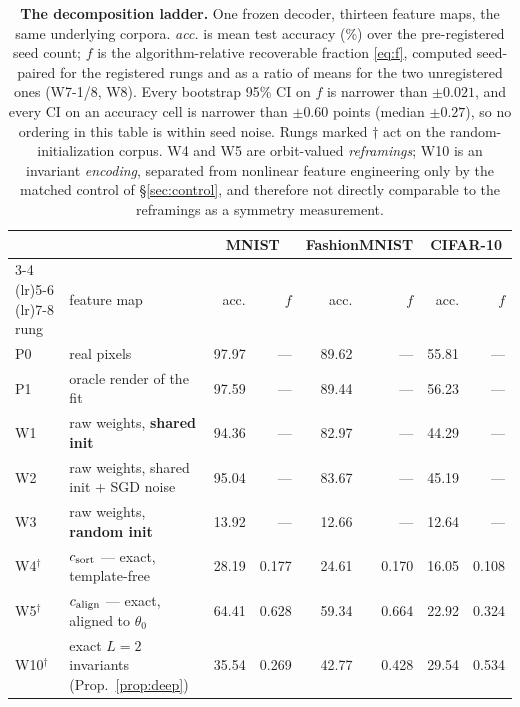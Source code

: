 \begin{table}[t]
\centering\small
\caption{\textbf{The decomposition ladder.} One frozen decoder, thirteen feature maps, the same underlying corpora. \emph{acc.} is mean test accuracy (\%) over the pre-registered seed count; $f$ is the algorithm-relative recoverable fraction \eqref{eq:f}, computed seed-paired for the registered rungs and as a ratio of means for the two unregistered ones (W7-1/8, W8). Every bootstrap 95\% CI on $f$ is narrower than $\pm0.021$, and every CI on an accuracy cell is narrower than $\pm0.60$ points (median $\pm0.27$), so no ordering in this table is within seed noise. Rungs marked $\dagger$ act on the random-initialization corpus. W4 and W5 are orbit-valued \emph{reframings}; W10 is an invariant \emph{encoding}, separated from nonlinear feature engineering only by the matched control of \S\ref{sec:control}, and therefore not directly comparable to the reframings as a symmetry measurement.}
\label{tab:ladder}
\begin{tabular}{@{}llr@{\hspace{5pt}}rr@{\hspace{5pt}}rr@{\hspace{5pt}}r@{}}
\toprule
& & \multicolumn{2}{c}{MNIST} & \multicolumn{2}{c}{FashionMNIST} & \multicolumn{2}{c}{CIFAR-10} \\
\cmidrule(lr){3-4} \cmidrule(lr){5-6} \cmidrule(lr){7-8}
rung & feature map & acc. & $f$ & acc. & $f$ & acc. & $f$ \\
\midrule
P0 & real pixels & 97.97 & --- & 89.62 & --- & 55.81 & --- \\
P1 & oracle render of the fit & 97.59 & --- & 89.44 & --- & 56.23 & --- \\
\midrule
W1 & raw weights, \textbf{shared init} & 94.36 & --- & 82.97 & --- & 44.29 & --- \\
W2 & raw weights, shared init + SGD noise & 95.04 & --- & 83.67 & --- & 45.19 & --- \\
W3 & raw weights, \textbf{random init} & 13.92 & --- & 12.66 & --- & 12.64 & --- \\
\midrule
W4$^\dagger$ & $c_{\mathrm{sort}}$ --- exact, template-free & 28.19 & 0.177 & 24.61 & 0.170 & 16.05 & 0.108 \\
W5$^\dagger$ & $c_{\mathrm{align}}$ --- exact, aligned to $\theta_0$ & 64.41 & 0.628 & 59.34 & 0.664 & 22.92 & 0.324 \\
W10$^\dagger$ & exact $L{=}2$ invariants (Prop.~\ref{prop:deep}) & 35.54 & 0.269 & 42.77 & 0.428 & 29.54 & 0.534 \\
\midrule

\end{tabular}
\end{table}
